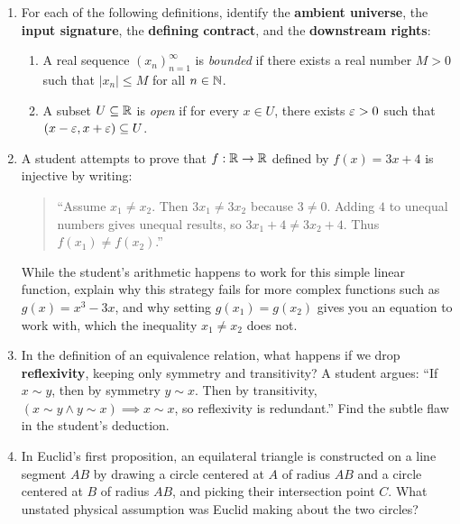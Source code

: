 \begin{enumerate}
\item For each of the following definitions, identify the \textbf{ambient universe}, the \textbf{input signature}, the \textbf{defining contract}, and the \textbf{downstream rights}:
\begin{enumerate}[label=(\alph*)]
\item A real sequence $(x_n)_{n=1}^\infty$ is \emph{bounded} if there exists a real number $M > 0$ such that $|x_n| \le M$ for all $n \in \mathbb{N}$.
\item A subset $U \subseteq \mathbb{R}$ is \emph{open} if for every $x \in U$, there exists $\varepsilon > 0$ such that $(x - \varepsilon, x + \varepsilon) \subseteq U$.
\end{enumerate}

\item A student attempts to prove that $f: \mathbb{R} \to \mathbb{R}$ defined by $f(x) = 3x + 4$ is injective by writing:
\begin{quote}
``Assume $x_1 \neq x_2$. Then $3x_1 \neq 3x_2$ because $3 \neq 0$. Adding $4$ to unequal numbers gives unequal results, so $3x_1 + 4 \neq 3x_2 + 4$. Thus $f(x_1) \neq f(x_2)$.''
\end{quote}
While the student's arithmetic happens to work for this simple linear function, explain why this strategy fails for more complex functions such as $g(x) = x^3 - 3x$, and why setting $g(x_1) = g(x_2)$ gives you an equation to work with, which the inequality $x_1 \neq x_2$ does not.

\item In the definition of an equivalence relation, what happens if we drop \textbf{reflexivity}, keeping only symmetry and transitivity? A student argues: ``If $x \sim y$, then by symmetry $y \sim x$. Then by transitivity, $(x \sim y \land y \sim x) \implies x \sim x$, so reflexivity is redundant.'' Find the subtle flaw in the student's deduction.

\item In Euclid's first proposition, an equilateral triangle is constructed on a line segment $AB$ by drawing a circle centered at $A$ of radius $AB$ and a circle centered at $B$ of radius $AB$, and picking their intersection point $C$. What unstated physical assumption was Euclid making about the two circles?
\end{enumerate}

